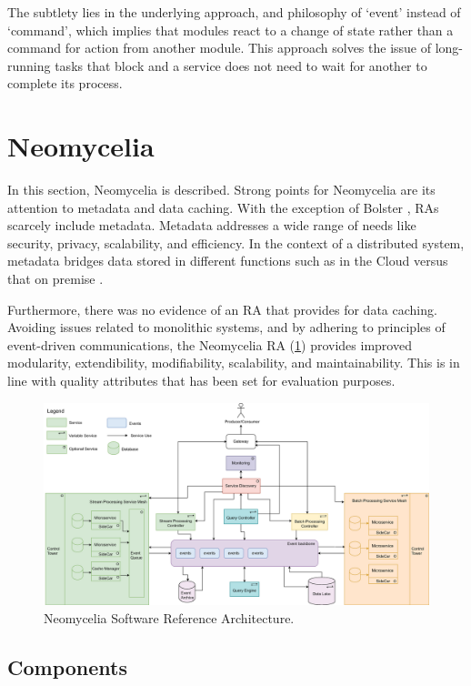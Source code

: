 \documentclass[conference]{IEEEtran}
\begin{document}
The subtlety lies in the underlying approach, and philosophy of ‘event’ instead of ‘command’, which implies that modules react to a change of state rather than a command for action from another module. This approach solves the issue of long-running tasks that block and a service does not need to wait for another to complete its process.


\section{Neomycelia}

In this section, Neomycelia is described. Strong points for Neomycelia are its attention to metadata and data caching. With the exception of Bolster \cite{Nadal}, RAs scarcely include metadata. Metadata addresses a wide range of needs like security, privacy, scalability, and efficiency. In the context of  a distributed system, metadata bridges data stored in different functions such as in the Cloud versus that on premise \cite{Eichler}.

Furthermore, there was no evidence of an RA that provides for data caching. Avoiding issues related to monolithic systems, and by adhering to principles of event-driven communications, the Neomycelia RA (\ref{NeomyceliaFig}) provides improved modularity, extendibility, modifiability, scalability, and maintainability. This is in line with quality attributes that has been set for evaluation purposes.

\begin{figure}[!ht]
    \centering
    \includegraphics[width=\textwidth]{Neomycelia-Minimal.eps}
    \caption{Neomycelia Software Reference Architecture.} \label{NeomyceliaFig}
\end{figure}

\subsection{Components}
\end{document}
